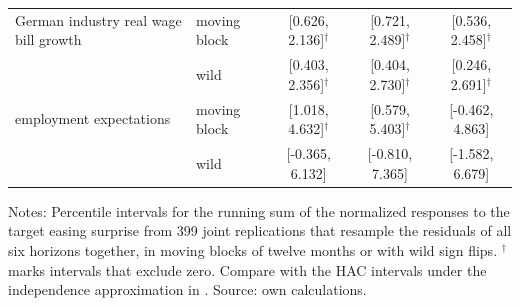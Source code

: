 \begin{table}[htbp]
\begin{tabular}{@{}llccc@{}}
    German industry real wage bill growth & moving block & [0.626, 2.136]$^{\dagger}$ & [0.721, 2.489]$^{\dagger}$ & [0.536, 2.458]$^{\dagger}$ \\
     & wild & [0.403, 2.356]$^{\dagger}$ & [0.404, 2.730]$^{\dagger}$ & [0.246, 2.691]$^{\dagger}$ \\[0.3em]
    employment expectations & moving block & [1.018, 4.632]$^{\dagger}$ & [0.579, 5.403]$^{\dagger}$ & [-0.462, 4.863] \\
     & wild & [-0.365, 6.132] & [-0.810, 7.365] & [-1.582, 6.679] \\[0.3em]
    \bottomrule
  \end{tabular}
  \vspace{0.3em}
  \begin{minipage}{\textwidth}\footnotesize{}
  Notes: Percentile intervals for the running sum of the normalized responses to the
  target easing surprise from 399 joint replications that resample the residuals of all
  six horizons together, in moving blocks of twelve months or with wild sign flips.
  $^{\dagger}$ marks intervals that exclude zero. Compare with the HAC intervals under
  the independence approximation in .
  Source: own calculations.
  \end{minipage}
\end{table}
